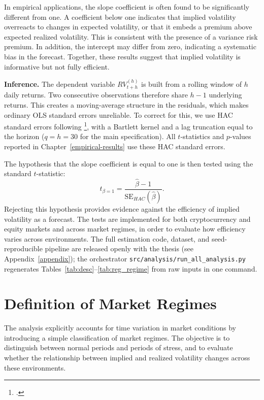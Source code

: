 \documentclass[11pt,a4paper,openany]{report}
\newcommand{\fcitet}[1]{\citet{#1}\footnote{\bibentry{#1}.}}
\begin{document}
In empirical applications, the slope coefficient is often found to be
significantly different from one. A coefficient below one indicates that
implied volatility overreacts to changes in expected volatility, or that
it embeds a premium above expected realized volatility. This is
consistent with the presence of a variance risk premium. In addition,
the intercept may differ from zero, indicating a systematic bias in the
forecast. Together, these results suggest that implied volatility is
informative but not fully efficient.

\textbf{Inference.} The dependent variable $RV^{(h)}_{t+h}$ is built
from a rolling window of $h$ daily returns. Two consecutive
observations therefore share $h-1$ underlying returns. This creates a
moving-average structure in the residuals, which makes ordinary OLS
standard errors unreliable. To correct for this, we use HAC standard
errors following \fcitet{newey1987}, with a Bartlett kernel and a lag
truncation equal to the horizon ($q = h = 30$ for the main
specification). All $t$-statistics and $p$-values reported in
Chapter~\ref{empirical-results} use these HAC standard errors.

The hypothesis that the slope coefficient is equal to one is then tested
using the standard $t$-statistic:
\begin{equation}
t_{\beta=1} = \frac{\hat{\beta} - 1}{\mathrm{SE}_{HAC}(\hat{\beta})}.
\label{eq:ttest}
\end{equation}
Rejecting this hypothesis provides evidence against the efficiency of
implied volatility as a forecast. The tests are implemented for both
cryptocurrency and equity markets and across market regimes, in order to
evaluate how efficiency varies across environments. The full estimation
code, dataset, and seed-reproducible pipeline are released openly with
the thesis (see Appendix~\ref{appendix}); the orchestrator
\texttt{src/analysis/run\_all\_analysis.py} regenerates
Tables~\ref{tab:desc}--\ref{tab:reg_regime} from raw inputs in one
command.

\section{Definition of Market
Regimes}\label{definition-of-market-regimes}

The analysis explicitly accounts for time variation in market conditions
by introducing a simple classification of market regimes. The objective
is to distinguish between normal periods and periods of stress, and to
evaluate whether the relationship between implied and realized
volatility changes across these environments.
\end{document}
